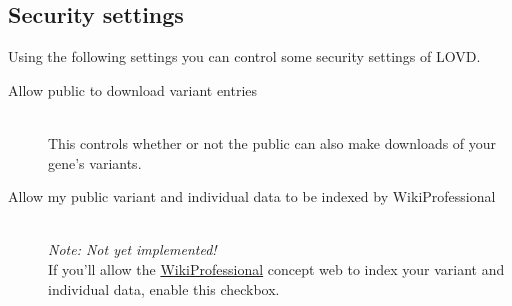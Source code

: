 \documentclass[a4paper,oneside,openany,12pt]{memoir}
\begin{document}
\pagebreak[4] %
\subsection{Security settings}
Using the following settings you can control some security settings of LOVD.
\begin{description}
  \item[Allow public to download variant entries] \hfill \\
  This controls whether or not the public can also make downloads of your gene's variants.
  \item[Allow my public variant and individual data to be indexed by WikiProfessional] \hfill \\
  \emph{Note: Not yet implemented!}
  \\
  If you'll allow the \href{http://www.wikiprofessional.org/}{WikiProfessional} concept web to index your variant and individual data, enable this checkbox.
\end{description}





\hypertarget{s_gene_homepage}{}
\end{document}

